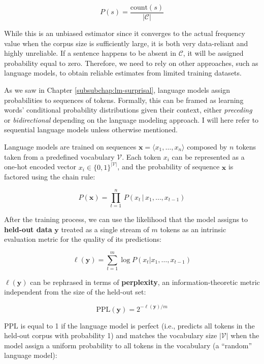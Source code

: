 \documentclass[a4paper, nobind]{templates/ociamthesis}
\begin{document}
\begin{equation}
P(s) = \frac{\text{count}(s)}{|\mathcal{C}|}
\end{equation}

While this is an unbiased estimator since it converges to the actual frequency value when the corpus size is sufficiently large, it is both very data-reliant and highly unreliable. If a sentence happens to be absent in \(\mathcal{C}\), it will be assigned probability equal to zero. Therefore, we need to rely on other approaches, such as language models, to obtain reliable estimates from limited training datasets.

As we saw in Chapter \ref{subsubchap:lm-surprisal}, language models assign probabilities to sequences of tokens. Formally, this can be framed as learning words' conditional probability distributions given their context, either \emph{preceding} or \emph{bidirectional} depending on the language modeling approach. I will here refer to sequential language models unless otherwise mentioned.

Language models are trained on sequences \(\textbf{x} = \langle x_1, \dots, x_n \rangle\) composed by \(n\) tokens taken from a predefined vocabulary \(\mathcal{V}\). Each token \(x_i\) can be represented as a one-hot encoded vector \(x_i \in \{0,1\}^{|\mathcal{V}|}\), and the probability of sequence \(\textbf{x}\) is factored using the chain rule:

\begin{equation}
P(\textbf{x}) = \prod_{t=1}^{n}\,P(x_t\,|\,x_1,\dots,x_{t-1})
\end{equation}

After the training process, we can use the likelihood that the model assigns to \textbf{held-out data} \(\textbf{y}\) treated as a single stream of \(m\) tokens as an intrinsic evaluation metric for the quality of its predictions:

\begin{equation}
\ell(\textbf{y}) = \sum_{t=1}^m \log P(x_t|x_1,\dots,x_{t-1})
\end{equation}

\(\ell(\textbf{y})\) can be rephrased in terms of \textbf{perplexity}, an information-theoretic metric independent from the size of the held-out set:

\begin{equation}
\text{PPL}(\textbf{y}) = 2^{-\ell(\textbf{y})/m}
\end{equation}

\(\text{PPL}\) is equal to 1 if the language model is perfect (i.e., predicts all tokens in the held-out corpus with probability 1) and matches the vocabulary size \(|\mathcal{V}|\) when the model assign a uniform probability to all tokens in the vocabulary (a ``random'' language model):
\end{document}
